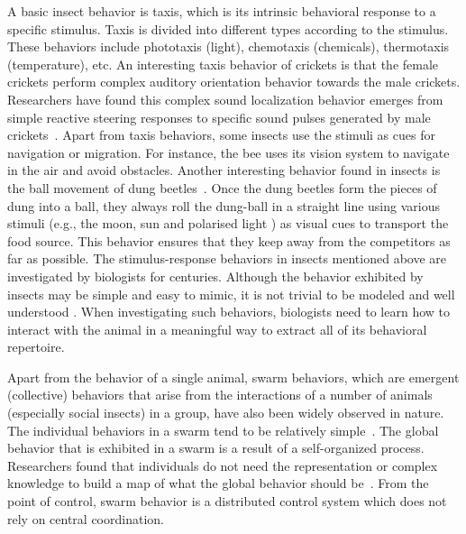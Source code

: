 A basic insect behavior is taxis, which is its intrinsic behavioral response to a specific stimulus. Taxis is divided into different types according to the stimulus. These behaviors include phototaxis (light), chemotaxis (chemicals), thermotaxis (temperature), etc. An interesting taxis behavior of crickets is that the female crickets perform complex auditory orientation behavior towards the male crickets. Researchers have found this complex sound localization behavior emerges from simple reactive steering responses to specific sound pulses generated by male crickets~\cite{Hedwig2004}. Apart from taxis behaviors, some insects use the stimuli as cues for navigation or migration. For instance, the bee uses its vision system to navigate in the air and avoid obstacles. Another interesting behavior found in insects is the ball movement of dung beetles~\cite{Emily_2012}. Once the dung beetles form the pieces of dung into a ball, they always roll the dung-ball in a straight line using various stimuli (e.g., the moon, sun and polarised light \cite{Byrne_2003, Matthews_1962}) as visual cues to transport the food source. This behavior ensures that they keep away from the competitors as far as possible. The stimulus-response behaviors in insects mentioned above are investigated by biologists for centuries. Although the behavior exhibited by insects may be simple and easy to mimic, it is not trivial to be modeled and well understood \cite{Ignacio2009}. When investigating such behaviors, biologists need to learn how to interact with the animal in a meaningful way to extract all of its behavioral repertoire. 

Apart from the behavior of a single animal, swarm behaviors, which are emergent (collective) behaviors that arise from the interactions of a number of animals (especially social insects) in a group, have also been widely observed in nature. The individual behaviors in a swarm tend to be relatively simple~\cite{Camazine2001}. The global behavior that is exhibited in a swarm is a result of a self-organized process. Researchers found that individuals do not need the representation or complex knowledge to build a map of what the global behavior should be~\cite{Garnier:SI:2007}. From the point of control, swarm behavior is a distributed control system which does not rely on central coordination.

